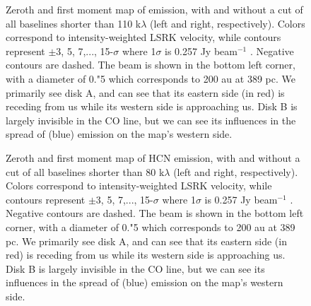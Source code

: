 \begin{figure}[h]
  \hspace*{\fill}%
  \vfill%
  \hspace*{\fill}%
  \caption{Zeroth and first moment map of \hco emission, with and without a cut of all baselines shorter than 110 k$\lambda$ (left and right, respectively). Colors correspond to intensity-weighted LSRK velocity, while contours represent $\pm$3, 5, 7,..., 15-$\sigma$ where 1$\sigma$ is 0.257 Jy beam$^{-1}$ \kms. Negative contours are dashed. The beam is shown in the bottom left corner, with a diameter of 0."5 which corresponds to 200 au at 389 pc. We primarily see disk A, and can see that its eastern side (in red) is receding from us while its western side is approaching us. Disk B is largely invisible in the CO line, but we can see its influences in the spread of (blue) emission on the map's western side.}
  \label{fig:hco_moments}
\end{figure}

\begin{figure}[h]
  \hspace*{\fill}%
  \vfill%
  \hspace*{\fill}%
  \caption{Zeroth and first moment map of HCN emission, with and without a cut of all baselines shorter than 80 k$\lambda$ (left and right, respectively). Colors correspond to intensity-weighted LSRK velocity, while contours represent $\pm$3, 5, 7,..., 15-$\sigma$ where 1$\sigma$ is 0.257 Jy beam$^{-1}$ \kms. Negative contours are dashed. The beam is shown in the bottom left corner, with a diameter of 0."5 which corresponds to 200 au at 389 pc. We primarily see disk A, and can see that its eastern side (in red) is receding from us while its western side is approaching us. Disk B is largely invisible in the CO line, but we can see its influences in the spread of (blue) emission on the map's western side.}
  \label{fig:hcn_moments}
\end{figure}


